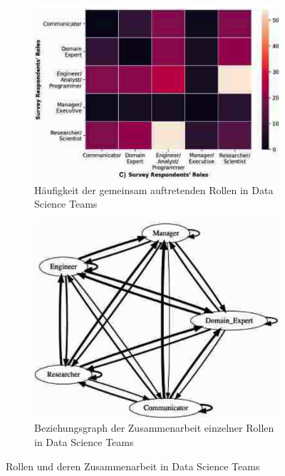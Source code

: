 \begin{figure}[h]
    \centering
    \begin{subfigure}[b]{0.45\textwidth}
      \includegraphics[width=\textwidth]{graphics/ds team roles.png}
      \caption{Häufigkeit der gemeinsam auftretenden Rollen in Data Science Teams}
      \label{fig:heatmap roles}
    \end{subfigure}
    \hfill
    \begin{subfigure}[b]{0.45\textwidth}
      \includegraphics[width=\textwidth]{graphics/ds team network .png}
      \caption{Beziehungsgraph der Zusammenarbeit einzelner Rollen in Data Science Teams}
      \label{fig:network graph}
    \end{subfigure}
    \caption{Rollen und deren Zusammenarbeit in Data Science Teams}
    \label{fig:both_figures}
\end{figure}

